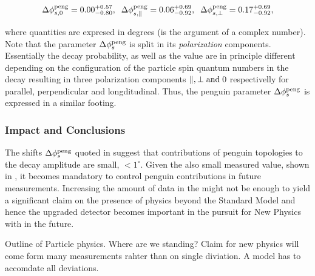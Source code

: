 \begin{equation}
\label{app_delta_phis_result}
  \Delta\phi^{\rm peng}_{s,{0}}         = 0.00 ^{+0.57}_{-0.80}, \;\;
  \Delta\phi^{\rm peng}_{s,{\parallel}} = 0.06 ^{+0.69}_{-0.92}, \;\;
  \Delta\phi^{\rm peng}_{s,{\perp}}     = 0.17 ^{+0.69}_{-0.92},
\end{equation}

\noindent where quantities are expresed in degrees (\phis is the argument of a complex number).
Note that the parameter $\Delta\phi_{s}^{\tiny\text{peng}}$ is split in its {\it polarization}
components. Essentially the \BsJpsiPhi decay probability, as well as the \phis value
are in principle different depending on the configuration of the particle spin
quantum numbers in the \BsJpsiPhi decay resulting in three polarization components
$\parallel,\perp {\rm and}\; 0$ respectivelly for parallel, perpendicular and longditudinal.
Thus, the penguin parameter $\Delta\phi_{s}^{\tiny\text{peng}}$ is expressed in a similar footing.


\subsubsection{Impact and Conclusions}

The shifts $\Delta\phi_{s}^{\tiny\text{peng}}$ quoted in 
suggest that contributions of penguin topologies to the \BsJpsiPhi decay amplitude are
small, $<1^\circ$. Given the also small \phis measured value, shown in ,
it becomes mandatory to control penguin contributions in future \phis measurements.
Increasing the amount of data in the \lhc \runtwo might not be enough to yield
a significant claim on the presence of physics beyond the Standard Model and hence
the upgraded \lhcb detector becomes important in the pursuit for New Physics with
\phis in the future.


Outline of Particle physics. Where are we standing? Claim for new physics will come form
many measurements rahter than on single diviation. A model has to accomdate all deviations.
